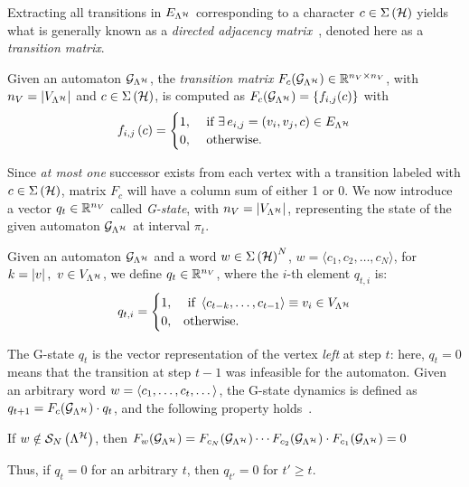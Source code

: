 Extracting all transitions in $E_{\Lambda^{\mathcal{H}}}$ corresponding to a character $c \in \Sigma\left(\mathcal{H}\right)$ yields what is generally known as a \emph{directed adjacency matrix}~\cite{xu2012matrix}, denoted here as a \emph{transition matrix}.
\begin{definition}%
    \label{def:transition}%
    Given an automaton $\mathcal{G}_{\Lambda^{\mathcal{H}}}$, the \emph{transition matrix} $F_{c} ( \mathcal{G}_{\Lambda^{\mathcal{H}}} ) \in \mathbb{R}^{n_V\times n_V}$, with $n_V =\left|V_{\Lambda^{\mathcal{H}}}\right| $ and $c \in \Sigma\left(\mathcal{H}\right)$, is computed as $F_{c} ( \mathcal{G}_{\Lambda^{\mathcal{H}}} ) = \{f_{i,j}(c)\}$ with
    \begin{equation*}
        f_{i,j}\left(c\right)=
        \begin{cases}
            1, &\text{ if } \exists \, e_{i, j} = (v_i,v_j,c) \in E_{\Lambda^{\mathcal{H}}} \\
            0, &\text{ otherwise.}
        \end{cases}
        \end{equation*}%
\end{definition}
%
Since \emph{at most one} successor exists from each vertex with a transition labeled with $c \in \Sigma\left(\mathcal{H}\right)$, matrix $F_c$ will have a column sum of either 1 or 0.
We now introduce a vector $q_t \in \mathbb{R}^{n_V}$ called \emph{G-state}, with $n_V =\left|V_{\Lambda^{\mathcal{H}}}\right| $, representing the state of the given automaton $\mathcal{G}_{\Lambda^{\mathcal{H}}}$ at interval $\pi_t$.
\begin{definition}[G-state $q_t$]%
    \label{def:qt}%
    Given an automaton $\mathcal{G}_{\Lambda^{\mathcal{H}}}$ and a word $w \in \Sigma\left( \mathcal{H} \right)^N$, $w=\langle c_1,c_2,\dots,c_N \rangle$, for $k = \left|v\right|,\,\, v\in V_{\Lambda^{\mathcal{H}}}$, we define $q_t\in \mathbb{R}^{n_V}$, where the $i$-th element $q_{t,i}$ is:
    \begin{equation*}
        q_{t,i}=
        \begin{cases}
            1, &\text{ if } \left\langle c_{t-k},\dots,c_{t-1}\right\rangle \equiv v_i \in V_{\Lambda^{\mathcal{H}}} \\
            0, &\text{otherwise}.
        \end{cases}
    \end{equation*}
\end{definition}
The G-state $q_t$ is the vector representation of the vertex \emph{left} at step $t$: here, $q_t=0$ means that the transition at step $t-1$ was infeasible for the automaton. 
Given an arbitrary word $w=\left\langle c_1,\dots,c_t,\dots\right\rangle$, the G-state dynamics is defined as $q_{t+1} = F_{c} ( \mathcal{G}_{\Lambda^{\mathcal{H}}} )\cdot q_t$, and the following property holds~\cite{xu2012matrix}.
\begin{lemma}%
    \label{cor:Fseqnotinlambda}%
    If $w \notin \mathcal{S}_{N}\left( \Lambda^{\mathcal{H}} \right)$, then $F_{w} ( \mathcal{G}_{\Lambda^{\mathcal{H}}} ) = F_{c_N} ( \mathcal{G}_{\Lambda^{\mathcal{H}}} )\cdots F_{c_2} ( \mathcal{G}_{\Lambda^{\mathcal{H}}} )\cdot F_{c_1} ( \mathcal{G}_{\Lambda^{\mathcal{H}}} ) = 0$
\end{lemma}
Thus, if $q_t=0$ for an arbitrary $t$, then $q_{t'}=0$ for $t' \geq t$.
